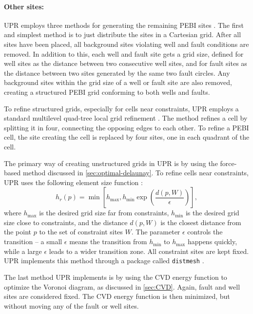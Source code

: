 \paragraph{Other sites:}
UPR employs three methods for generating the remaining PEBI sites \cite{UPR_thesis}. The first and simplest method is to just distribute the sites in a Cartesian grid. After all sites have been placed, all background sites violating well and fault conditions are removed. In addition to this, each well and fault site gets a grid size, defined for well sites as the distance between two consecutive well sites, and for fault sites as the distance between two sites generated by the same two fault circles. Any background sites within the grid size of a well or fault site are also removed, creating a structured PEBI grid conforming to both wells and faults.

To refine structured grids, especially for cells near constraints, UPR employs a standard multilevel quad-tree local grid refinement \cite[pp.49]{UPR_thesis}. The method refines a cell by splitting it in four, connecting the opposing edges to each other. To refine a PEBI cell, the site creating the cell is replaced by four sites, one in each quadrant of the cell.

The primary way of creating unstructured grids in UPR is by using the force-based method discussed in \autoref{sec:optimal-delaunay}. To refine cells near constraints, UPR uses the following element size function \cite[Equation 4.2]{UPR_thesis}:
\begin{equation}
    h_r(p) = \min \left[
        h_{\max}, h_{\min} \exp \left(
            \frac{d(p, W)}{\epsilon}
        \right) \right],
\end{equation}
where $h_{\max}$ is the desired grid size far from constraints, $h_{\min}$ is the desired grid size close to constraints, and the distance $d(p, W)$ is the closest distance from the point $p$ to the set of constraint sites $W$. The parameter $\epsilon$ controls the transition -- a small $\epsilon$ means the transition from $h_{\min}$ to $h_{\max}$ happens quickly, while a large $\epsilon$ leads to a wider transition zone. All constraint sites are kept fixed. UPR implements this method through a package called \verb|distmesh| \cite{Distmesh}.

The last method UPR implements is by using the CVD energy function to optimize the Voronoi diagram, as discussed in \autoref{sec:CVD}. Again, fault and well sites are considered fixed. The CVD energy function is then minimized, but without moving any of the fault or well sites.

